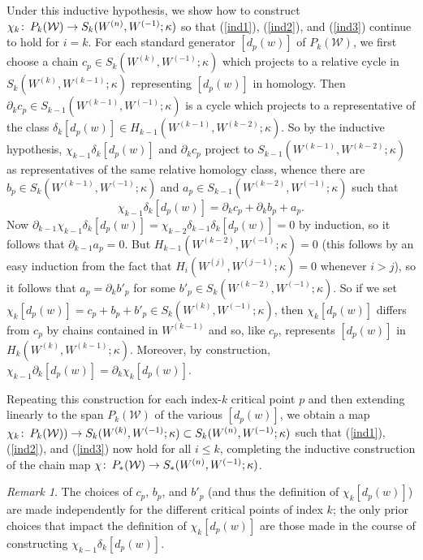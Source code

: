 \documentclass[11pt]{amsart}
\theoremstyle{definition}
\theoremstyle{remark}
\newtheorem{remark}[theorem]{Remark}
\numberwithin{equation}{section}
\def\co{\colon\thinspace}
\begin{document}
Under this inductive hypothesis, we show how to construct $\chi_k\co P_k(\mathcal{W})\to S_k(W^{(n)},W^{(-1)};\kappa)$ so that (\ref{ind1}), (\ref{ind2}), and (\ref{ind3}) continue to hold for $i=k$.   For each standard generator $[d_p(w)]$ of $P_k(\mathcal{W})$, we first choose a chain $c_p\in S_k(W^{(k)},W^{(-1)};\kappa)$ which projects to a relative cycle in $S_k(W^{(k)},W^{(k-1)};\kappa)$ representing $[d_p(w)]$ in homology. Then $\partial_kc_p\in S_{k-1}(W^{(k-1)},W^{(-1)};\kappa)$ is a cycle which projects to a representative of the class $\delta_k[d_p(w)]\in H_{k-1}(W^{(k-1)},W^{(k-2)};\kappa)$.  So by the inductive hypothesis, $\chi_{k-1}\delta_k[d_p(w)]$ and $\partial_kc_p$ project to $S_{k-1}(W^{(k-1)},W^{(k-2)};\kappa)$ as representatives of the same relative homology class, whence there are $b_p\in S_{k}(W^{(k-1)},W^{(-1)};\kappa)$ and $a_p\in S_{k-1}(W^{(k-2)},W^{(-1)};\kappa)$ such that \[ \chi_{k-1}\delta_k[d_p(w)]=\partial_kc_p+\partial_kb_p+a_p. \]  Now $\partial_{k-1}\chi_{k-1}\delta_k[d_p(w)]=\chi_{k-2}\delta_{k-1}\delta_k[d_p(w)]=0$ by induction, so it follows that $\partial_{k-1}a_p=0$.  But $H_{k-1}(W^{(k-2)},W^{(-1)};\kappa)=0$ (this follows by an easy induction from the fact that $H_i(W^{(j)},W^{(j-1)};\kappa)=0$ whenever $i>j$), so it follows that $a_p=\partial_kb'_p$ for some $b'_p\in S_k(W^{(k-2)},W^{(-1)};\kappa)$.  So if we set $\chi_k[d_p(w)]=c_p+b_p+b'_p\in S_k(W^{(k)},W^{(-1)};\kappa)$, then $\chi_k[d_p(w)]$ differs from $c_p$ by  chains contained in $W^{(k-1)}$ and so, like  $c_p$, represents $[d_p(w)]$ in $H_k(W^{(k)},W^{(k-1)};\kappa)$.  Moreover, by construction, $\chi_{k-1}\partial_k[d_p(w)]=\partial_k\chi_k[d_p(w)]$. 

Repeating this construction for each index-$k$ critical point $p$ and then extending linearly to the span $P_k(\mathcal{W})$ of the various $[d_p(w)]$, we obtain a map $\chi_k\co P_k(\mathcal{W}))\to S_k(W^{(k)},W^{(-1)};\kappa)\subset S_k(W^{(n)},W^{(-1)};\kappa)$ such that (\ref{ind1}), (\ref{ind2}), and (\ref{ind3}) now hold for all $i\leq k$, completing the inductive construction of the chain map $\chi\co P_*(\mathcal{W})\to S_*(W^{(n)},W^{(-1)};\kappa)$.







\begin{remark} The choices of $c_p$, $b_p$, and $b'_p$ (and thus the definition of $\chi_k[d_p(w)]$) are made independently for the different critical points of index $k$; the only prior choices that impact the definition of $\chi_k[d_p(w)]$ are those made in the course of constructing $\chi_{k-1}\delta_{k}[d_p(w)]$.  
\end{remark}
\end{document}
